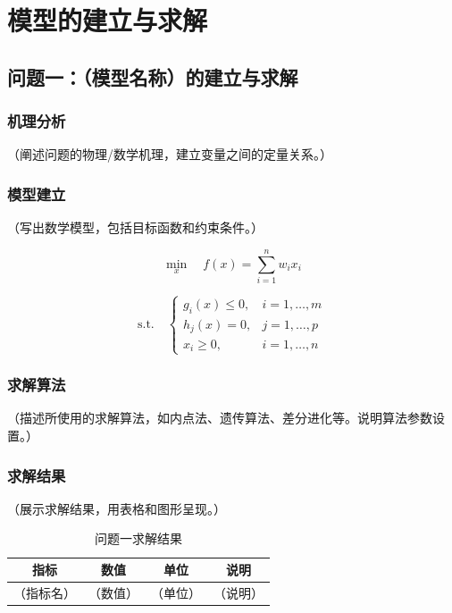 \documentclass[12pt, a4paper]{article}
\begin{document}
\section{模型的建立与求解}

\subsection{问题一：（模型名称）的建立与求解}

\subsubsection{机理分析}

（阐述问题的物理/数学机理，建立变量之间的定量关系。）

\subsubsection{模型建立}

（写出数学模型，包括目标函数和约束条件。）

\begin{equation}
    \min_{x} \quad f(x) = \sum_{i=1}^{n} w_i x_i
    \label{eq:obj1}
\end{equation}

\begin{equation}
    \text{s.t.} \quad
    \begin{cases}
        g_i(x) \leq 0, & i = 1, \ldots, m \\
        h_j(x) = 0,    & j = 1, \ldots, p \\
        x_i \geq 0,    & i = 1, \ldots, n
    \end{cases}
    \label{eq:constraint1}
\end{equation}

\subsubsection{求解算法}

（描述所使用的求解算法，如内点法、遗传算法、差分进化等。说明算法参数设置。）

\subsubsection{求解结果}

（展示求解结果，用表格和图形呈现。）

\begin{table}[H]
\centering
\caption{问题一求解结果}
\label{tab:result1}
\begin{tabular}{cccc}
\toprule
\textbf{指标} & \textbf{数值} & \textbf{单位} & \textbf{说明} \\
\midrule
（指标名）  & （数值）  & （单位）  & （说明） \\
\bottomrule
\end{tabular}
\end{table}
\end{document}
